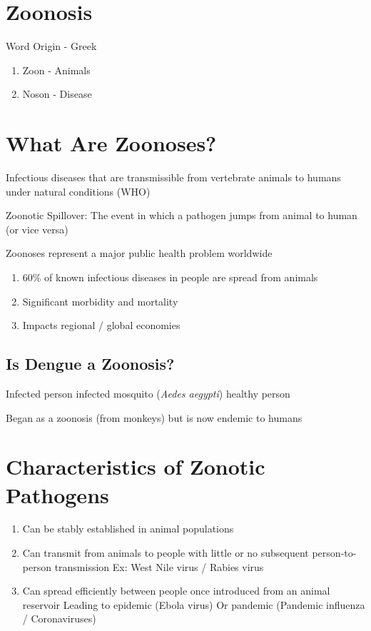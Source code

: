 \documentclass{notes}
\begin{document}
\section{Zoonosis}

Word Origin - Greek

\begin{enumerate}
    \item Zoon - Animals
    \item Noson - Disease
\end{enumerate}

\section{What Are Zoonoses?}

Infectious diseases that are transmissible from vertebrate animals to humans under natural conditions (WHO)

Zoonotic Spillover: The event in which a pathogen jumps from animal to human (or vice versa)

Zoonoses represent a major public health problem worldwide

\begin{enumerate}
    \item 60\% of known infectious diseases in people are spread from animals
    \item Significant morbidity and mortality
    \item Impacts regional / global economies
\end{enumerate}

\subsection{Is Dengue a Zoonosis?}

Infected person \indicates infected mosquito (\textit{Aedes aegypti}) \indicates healthy person

\tab \indicates Began as a zoonosis (from monkeys) but is now endemic to humans


\section{Characteristics of Zonotic Pathogens}

\begin{enumerate}
    \item Can be stably established in animal populations
    \item Can transmit from animals to people with little or no subsequent person-to-person transmission
    \subitem Ex: West Nile virus / Rabies virus
    \item Can spread efficiently between people once introduced from an animal reservoir
    \subitem Leading to epidemic (Ebola virus)
    \subitem Or pandemic (Pandemic influenza / Coronaviruses)
\end{enumerate}
\end{document}
